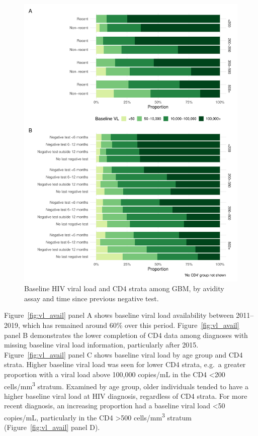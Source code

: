 \begin{figure}[htbp!]
  \centering
  \includegraphics[width=\textwidth]{vl_cd4_recent.pdf}
  \caption[Baseline HIV viral load and CD4 strata among GBM, by avidity assay and time since previous negative test]{Baseline HIV viral load and CD4 strata among GBM, by avidity assay and time since previous negative test.}\label{fig:vl_cd4_recent}
\end{figure}

Figure~\ref{fig:vl_avail} panel A shows baseline viral load availability between 2011--2019, which has remained around 60\% over this period. Figure~\ref{fig:vl_avail} panel B demonstrates the lower completion of CD4 data among diagnoses with missing baseline viral load information, particularly after 2015. Figure~\ref{fig:vl_avail} panel C shows baseline viral load by age group and CD4 strata. Higher baseline viral load was seen for lower CD4 strata, e.g.\ a greater proportion with a viral load above 100,000 copies/mL in the CD4 <200 cells/mm\textsuperscript{3} stratum. Examined by age group, older individuals tended to have a higher baseline viral load at HIV diagnosis, regardless of CD4 strata. For more recent diagnosis, an increasing proportion had a baseline viral load <50 copies/mL, particularly in the CD4 >500 cells/mm\textsuperscript{3} stratum (Figure~\ref{fig:vl_avail} panel D).

